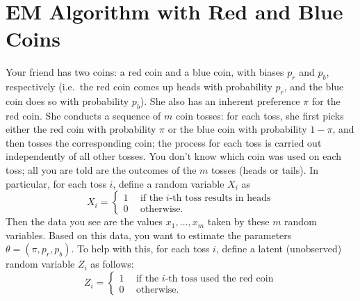 \section{EM Algorithm with Red and Blue Coins} 
Your friend has two coins: a red coin and a blue coin, with biases $p_r$ and $p_b$, respectively (i.e.\ the red coin comes up heads with probability $p_r$, and the blue coin does so with probability $p_b$). She also has an inherent preference $\pi$ for the red coin. She conducts a sequence of $m$ coin tosses: for each toss, she first picks either the red coin with probability $\pi$ or the blue coin with probability $1-\pi$, and then tosses the corresponding coin; the process for each toss is carried out independently of all other tosses. 
You don't know which coin was used on each toss; all you are told are the outcomes of the $m$ tosses (heads or tails). In particular, for each toss $i$, define a random variable $X_i$ as 
\[
X_i = \begin{cases}
	1 & ~~\text{if the $i$-th toss results in heads} \\
	0 & ~~\text{otherwise.}
	\end{cases}
\] 
Then the data you see are the values $x_1,\ldots,x_m$ taken by these $m$ random variables.
Based on this data, you want to estimate the parameters $\theta = (\pi, p_r, p_b)$.
To help with this, for each toss $i$, define a latent (unobserved) random variable $Z_i$ as follows:
\[
Z_i = \begin{cases}
	1 & ~~\text{if the $i$-th toss used the red coin} \\
	0 & ~~\text{otherwise.}
	\end{cases}
\]

